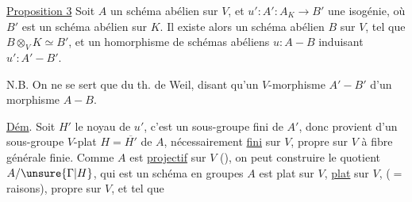 
\uline{Proposition 3} Soit $A$ un schéma abélien sur $V$,
et $u':A':A_K\longrightarrow B'$ une isogénie, où $B'$ est
un schéma abélien sur $K$. Il existe alors
un schéma abélien $B$ sur $V$, 
tel que $B\otimes_V K\simeq B'$, et un 
homorphisme  de schémas abéliens $u:A\mathrel{-}B$
induisant $u':A'\mathrel{-}B'$.

N.B. On ne se sert que du th. de Weil,
disant qu'un $V$-morphisme 
$A'\mathrel{-}B'$  d'un morphisme $A\mathrel{-}B$.

\uline{Dém}. Soit $H'$ le noyau de $u'$,
c'est un sous-groupe fini de $A'$, donc
provient d'un sous-groupe $V$-plat $H=\overline{H'}$ de
$A$, nécessairement \uline{fini} sur $V$,  propre  sur
$V$ à fibre générale finie. Comme
$A$ est \uline{projectif} sur $V$ (), on
peut construire le  quotient $A/\unsure{\Gamma|H}$,
qui est un schéma en groupes
 $A$ est plat sur $V$, \uline{plat} sur $V$,
($=$ raisons), propre sur $V$, et tel que
